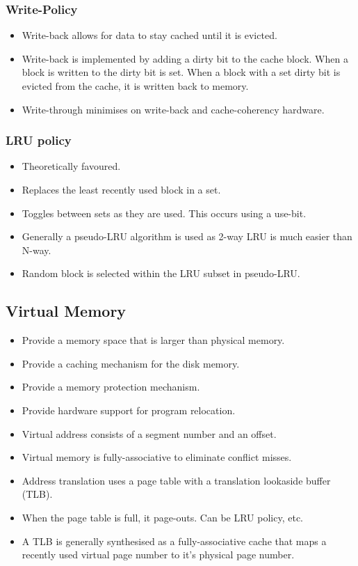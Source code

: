 \documentclass[8pt]{extarticle}
\begin{document}
\begin{multicols}{3}
\subsubsection{Write-Policy}
\begin{itemize}
  \item Write-back allows for data to stay cached until it is evicted.
  \item Write-back is implemented by adding a dirty bit to the cache block.
    When a block is written to the dirty bit is set. When a block with a set
    dirty bit is evicted from the cache, it is written back to memory.
  \item Write-through minimises on write-back and cache-coherency hardware.
\end{itemize}

\subsubsection{LRU policy}
\begin{itemize}
  \item Theoretically favoured.
  \item Replaces the least recently used block in a set.
  \item Toggles between sets as they are used. This occurs using a use-bit.
  \item Generally a pseudo-LRU algorithm is used as 2-way LRU is much
    easier than N-way.
  \item Random block is selected within the LRU subset in pseudo-LRU.
\end{itemize}

\subsection{Virtual Memory}
\begin{itemize}
  \item Provide a memory space that is larger than physical memory.
  \item Provide a caching mechanism for the disk memory.
  \item Provide a memory protection mechanism.
  \item Provide hardware support for program relocation.
  \item Virtual address consists of a segment number and an offset.
  \item Virtual memory is fully-associative to eliminate conflict misses.
  \item Address translation uses a page table with a translation
    lookaside buffer (TLB).
  \item When the page table is full, it page-outs. Can be LRU policy, etc.
  \item A TLB is generally synthesised as a fully-associative cache that maps
    a recently used virtual page number to it's physical page number.
\end{itemize}


\end{multicols}
\end{document}
